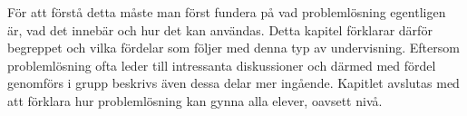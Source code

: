 \textcolor{lila}{För att förstå detta måste man först fundera på vad problemlösning egentligen är, vad det innebär och hur det kan användas. Detta kapitel förklarar därför begreppet och vilka fördelar som följer med denna typ av undervisning. Eftersom problemlösning ofta leder till intressanta diskussioner och därmed med fördel genomförs i grupp beskrivs även dessa delar mer ingående. Kapitlet avslutas med att förklara hur problemlösning kan gynna alla elever, oavsett nivå.}